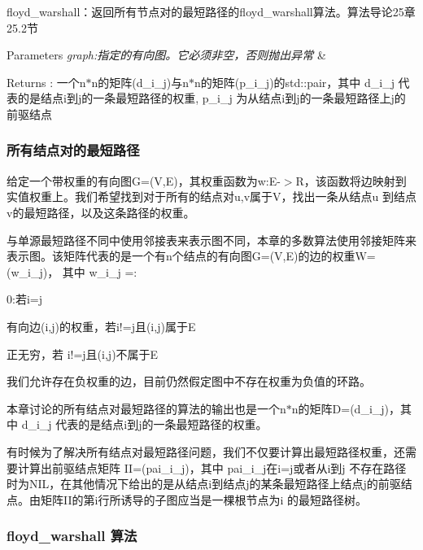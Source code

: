 floyd\+\_\+warshall：返回所有节点对的最短路径的floyd\+\_\+warshall算法。算法导论25章25.2节 


\begin{DoxyParams}{Parameters}
{\em graph\+:指定的有向图。它必须非空，否则抛出异常} & \\
\hline
\end{DoxyParams}
\begin{DoxyReturn}{Returns}
\+: 一个n$\ast$n的矩阵(d\+\_\+i\+\_\+j)与n$\ast$n的矩阵(p\+\_\+i\+\_\+j)的std\+::pair，其中 d\+\_\+i\+\_\+j 代表的是结点i到j的一条最短路径的权重, p\+\_\+i\+\_\+j 为从结点i到j的一条最短路径上j的前驱结点
\end{DoxyReturn}
\subsubsection*{所有结点对的最短路径}

给定一个带权重的有向图\+G=(V,E)，其权重函数为w\+:E-\/$>$R，该函数将边映射到实值权重上。我们希望找到对于所有的结点对u,v属于\+V，找出一条从结点u 到结点v的最短路径，以及这条路径的权重。

与单源最短路径不同中使用邻接表来表示图不同，本章的多数算法使用邻接矩阵来表示图。该矩阵代表的是一个有n个结点的有向图\+G=(V,E)的边的权重\+W=(w\+\_\+i\+\_\+j)， 其中 w\+\_\+i\+\_\+j =\+:


\begin{DoxyItemize}
\item 0\+:若i=j
\item 有向边(i,j)的权重，若i!=j且(i,j)属于\+E
\item 正无穷，若 i!=j且(i,j)不属于\+E
\end{DoxyItemize}

我们允许存在负权重的边，目前仍然假定图中不存在权重为负值的环路。

本章讨论的所有结点对最短路径的算法的输出也是一个n$\ast$n的矩阵\+D=(d\+\_\+i\+\_\+j)，其中 d\+\_\+i\+\_\+j 代表的是结点i到j的一条最短路径的权重。

有时候为了解决所有结点对最短路径问题，我们不仅要计算出最短路径权重，还需要计算出前驱结点矩阵 I\+I=(pai\+\_\+i\+\_\+j)，其中 pai\+\_\+i\+\_\+j在i=j或者从i到j 不存在路径时为\+N\+I\+L，在其他情况下给出的是从结点i到结点j的某条最短路径上结点j的前驱结点。由矩阵\+I\+I的第i行所诱导的子图应当是一棵根节点为i 的最短路径树。

\subsubsection*{floyd\+\_\+warshall 算法}

